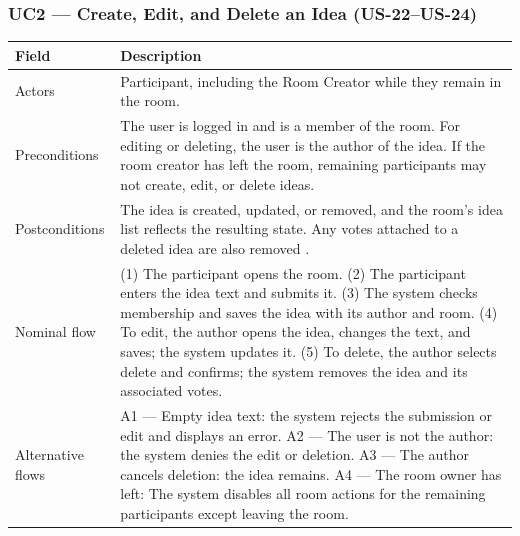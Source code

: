 \documentclass[12pt,a4paper]{report}
\begin{document}
\subsubsection{UC2 --- Create, Edit, and Delete an Idea (US-22--US-24)}
\begin{tabularx}{\textwidth}{|p{}|Y|}\hline
\textbf{Field} & \textbf{Description} \\\hline
Actors & Participant, including the Room Creator while they remain in the room. \\\hline
Preconditions & The user is logged in and is a member of the room. For editing or deleting, the user is the author of the idea. If the room creator has left the room, remaining participants may not create, edit, or delete ideas. \\\hline
Postconditions & The idea is created, updated, or removed, and the room's idea list reflects the resulting state. Any votes attached to a deleted idea are also removed . \\\hline
Nominal flow & (1) The participant opens the room. (2) The participant enters the idea text and submits it. (3) The system checks membership and saves the idea with its author and room. (4) To edit, the author opens the idea, changes the text, and saves; the system updates it. (5) To delete, the author selects delete and confirms; the system removes the idea and its associated votes. \\\hline
Alternative flows & A1 --- Empty idea text: the system rejects the submission or edit and displays an error. A2 --- The user is not the author: the system denies the edit or deletion. A3 --- The author cancels deletion: the idea remains. A4 --- The room owner has left: The system disables all room actions for the remaining participants except leaving the room. \\\hline
\end{tabularx}
\end{document}
